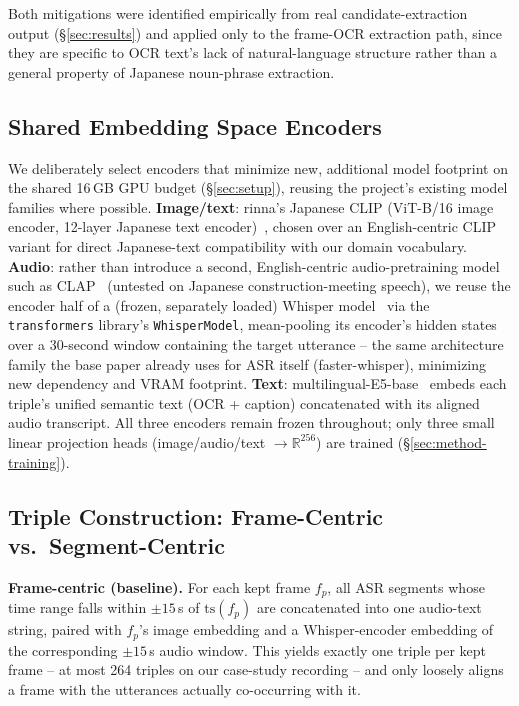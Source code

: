 ﻿\documentclass[twocolumn]{article}
\begin{document}
Both mitigations were identified empirically from real candidate-extraction output
(\S\ref{sec:results}) and applied only to the frame-OCR extraction path, since they are specific to
OCR text's lack of natural-language structure rather than a general property of Japanese noun-phrase
extraction.

\subsection{Shared Embedding Space Encoders}
\label{sec:method-encoders}

We deliberately select encoders that minimize new, additional model footprint on the shared 16\,GB
GPU budget (\S\ref{sec:setup}), reusing the project's existing model families where possible.
\textbf{Image/text}: rinna's Japanese CLIP (ViT-B/16 image encoder, 12-layer Japanese text
encoder)~\cite{sawada2024release}, chosen over an English-centric CLIP variant for direct
Japanese-text compatibility with our domain vocabulary. \textbf{Audio}: rather than introduce a
second, English-centric audio-pretraining model such as CLAP~\cite{elizalde2023clap} (untested on
Japanese construction-meeting speech), we reuse the encoder half of a (frozen, separately loaded)
Whisper model~\cite{radford2022whisper} via the \texttt{transformers} library's
\texttt{WhisperModel}, mean-pooling its encoder's hidden states over a 30-second window containing
the target utterance -- the same architecture family the base paper already uses for ASR itself
(faster-whisper), minimizing new dependency and VRAM footprint. \textbf{Text}:
multilingual-E5-base~\cite{wang2024e5} embeds each triple's unified semantic text (OCR + caption)
concatenated with its aligned audio transcript. All three encoders remain frozen throughout; only
three small linear projection heads (image/audio/text $\rightarrow \mathbb{R}^{256}$) are trained
(\S\ref{sec:method-training}).

\subsection{Triple Construction: Frame-Centric vs.\ Segment-Centric}
\label{sec:method-triples}

\textbf{Frame-centric (baseline).} For each kept frame $f_p$, all ASR segments whose time range
falls within $\pm 15$\,s of $\mathrm{ts}(f_p)$ are concatenated into one audio-text string, paired
with $f_p$'s image embedding and a Whisper-encoder embedding of the corresponding $\pm 15$\,s audio
window. This yields exactly one triple per kept frame -- at most 264 triples on our case-study
recording -- and only loosely aligns a frame with the utterances actually co-occurring with it.
\end{document}

